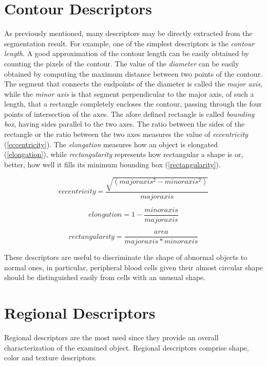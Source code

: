 \section{Contour Descriptors} %
As previously mentioned, many descriptors may be directly extracted from the segmentation result. For example, one of the simplest descriptors is the \textit{contour length}. A good approximation of the contour length can be easily obtained by counting the pixels of the contour. The value of the \textit{diameter} can be easily obtained by computing the maximum distance between two points of the contour. The segment that connects the endpoints of the diameter is called the \textit{major axis}, while the \textit{minor axis} is that segment perpendicular to the major axis, of such a length, that a rectangle completely encloses the contour, passing through the four points of intersection of the axes. The afore defined rectangle is called \textit{bounding box}, having sides parallel to the two axes. The ratio between the sides of the rectangle or the ratio between the two axes measures the value of \textit{eccentricity} (\ref{eccentricity}). The \textit{elongation} measures how an object is elongated (\ref{elongation}), while \textit{rectangularity} represents how rectangular a shape is or, better, how well it fills its minimum bounding box (\ref{rectangularity}).

\begin{equation}\label{eccentricity}
eccentricity=\frac{\sqrt{(major axis^2 - minor axis^2) }}{major axis}
\end{equation}

\begin{equation}\label{elongation}
elongation=1 - \frac{minor axis}{major axis}
\end{equation}

\begin{equation}\label{rectangularity}
rectangularity=\frac{area}{major axis*minor axis}
\end{equation}

These descriptors are useful to discriminate the shape of abnormal objects to normal ones, in particular, peripheral blood cells given their almost circular shape should be distinguished easily from cells with an unusual shape. 

\section{Regional Descriptors} %
Regional descriptors are the most used since they provide an overall characterization of the examined object. Regional descriptors comprise shape, color and texture descriptors.

